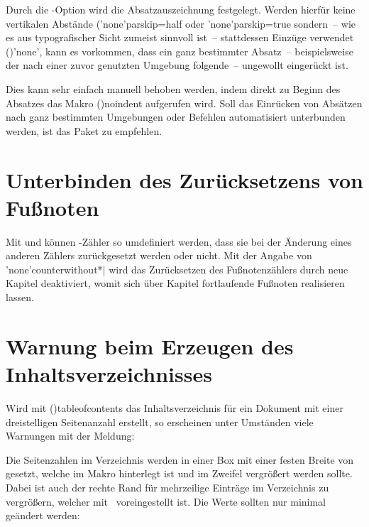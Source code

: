 \begin{Entity}{}
Durch die \KOMAScript-Option  wird
die Absatzauszeichnung  festgelegt. Werden hierfür keine vertikalen Abstände 
(\Option'none'{parskip=half} oder \Option'none'{parskip=true} sondern~-- wie 
es aus typografischer Sicht zumeist sinnvoll ist~-- stattdessen Einzüge 
verwendet ()'none', kann es vorkommen, dass ein ganz 
bestimmter Absatz~-- beispielsweise der nach einer zuvor genutzten Umgebung 
folgende~-- ungewollt eingerückt ist.
\end{Entity}
Dies kann sehr einfach manuell behoben werden, indem direkt zu Beginn des 
Absatzes das Makro \Macro(){noindent} aufgerufen wird. Soll 
das Einrücken von Absätzen nach ganz bestimmten Umgebungen oder Befehlen 
automatisiert unterbunden werden, ist das Paket  zu 
empfehlen.



\section{%
  Unterbinden des Zurücksetzens von Fußnoten%
}

Mit  und  können 
-Zähler so umdefiniert werden, dass sie bei der Änderung 
eines anderen Zählers zurückgesetzt werden oder nicht. Mit der Angabe von 
\Macro*'none'{counterwithout*|} wird das 
Zurücksetzen des Fußnotenzählers durch neue Kapitel deaktiviert, womit sich 
über Kapitel fortlaufende Fußnoten realisieren lassen.



\section{%
  Warnung beim Erzeugen des Inhaltsverzeichnisses%
}

%
Wird mit \Macro(){tableofcontents} das Inhaltsverzeichnis 
für ein Dokument mit einer dreistelligen Seitenanzahl erstellt, so erscheinen 
unter Umständen viele Warnungen mit der Meldung:
%
\begin{quoting}
\end{quoting}
%
Die Seitenzahlen im Verzeichnis werden in einer Box mit einer festen Breite 
von~\PValue{1.55em} gesetzt, welche im Makro  hinterlegt ist 
und im Zweifel vergrößert werden sollte. Dabei ist auch der rechte Rand für 
%
mehrzeilige Einträge im Verzeichnis  zu vergrößern, welcher 
mit~\PValue{2.55em} voreingestellt ist. Die Werte sollten nur minimal geändert 
werden:
%
\begin{quoting}
\begin{Code}
\makeatletter
\renewcommand*\@pnumwidth{1.7em}\renewcommand*\@tocrmarg{2.7em}
\makeatother
\end{Code}
\end{quoting}



